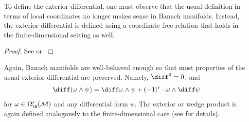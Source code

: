 To define the exterior differential, one must observe that the usual definition in terms of local coordinates no longer makes sense in Banach manifolds. Instead, the exterior differential is defined using a coordinate-free relation that holds in the finite-dimensional setting as well.

\begin{proof}
    See \parencite[Prop. E.3]{Schmeding_2022} or \parencite[Prop. 3.2]{SergeLang}
\end{proof}

Again, Banach manifolds are well-behaved enough so that most properties of the usual exterior differential are preserved. Namely, \(\diff^2=0\), and 
\[
\diff (\omega \wedge \psi)=\diff \omega \wedge \psi + (-1)^r \cdot \omega \wedge \diff \psi
\]
for \(\omega \in \Omega^r_\R(\mathcal{M})\) and any differential form \(\psi\). The exterior or wedge product is again defined analogously to the finite-dimensional case (see \parencite[Chapter V, section 3]{SergeLang} for details). 

